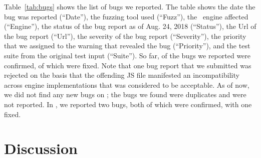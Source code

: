 \documentclass[10pt,conference,anonymous]{IEEEtran}
\begin{document}
Table~\ref{tab:bugs} shows the list of bugs we reported. The table
shows the date the bug was reported (``Date''), the fuzzing tool used
(``Fuzz''), the \js\ engine affected (``Engine''), the status of the
bug report as of Aug. 24, 2018 (``Status''), the Url of the bug report
(``Url''), the severity of the bug report (``Severity''), the priority
that we assigned to the warning that revealed the bug (``Priority''),
and the test suite from the original test input (``Suite''). So far,
\noDiffConfirmed{} of the bugs we reported were confirmed, \noDiffFixed{} of which
were fixed. Note that one bug report that we submitted was rejected on
the basis that the offending JS file manifested an incompatibility
across engine implementations that was considered to be acceptable. As
of now, we did not find any new bugs on \smonkey{}; the bugs we found
were duplicates and were not reported. In \veight{}, we reported two
bugs, both of which were confirmed, with one fixed.





\begin{center}
\end{center}


\section{Discussion}
\label{sec:bugs}
\end{document}

